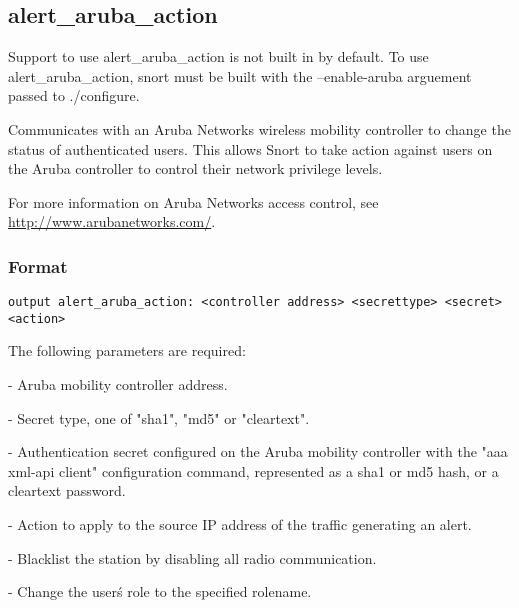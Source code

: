 \documentclass[english]{report}
\newenvironment{note}{
\samepage
    \vspace{10pt}{\textsf{
        {\hspace{7pt}\Huge{$\triangle$\hspace{-12.5pt}{\Large{$^!$}}}}\hspace{5pt}
        {\Large{NOTE}}
    }
    }
   \begin{center}
    \par\vspace{-17pt}

    \begin{lrbox}{\savepar}
    \begin{minipage}[r]{6in}
}
{
    \end{minipage}
    \end{lrbox}
    \fbox{
        \usebox{
            \savepar
	}
    }
    \par\vskip10pt
    \end{center}
}
\begin{document}
\subsection{alert\_aruba\_action}

\begin{note}
Support to use alert\_aruba\_action is not built in by default.  To
use alert\_aruba\_action, snort must be built with the --enable-aruba
arguement passed to ./configure.
\end{note}

Communicates with an Aruba Networks wireless mobility controller to
change the status of authenticated users.  This allows Snort to take
action against users on the Aruba controller to control their network
privilege levels.

For more information on Aruba Networks access control, see
\url{http://www.arubanetworks.com/}.

\subsubsection{Format}

\begin{verbatim}
output alert_aruba_action: <controller address> <secrettype> <secret> <action>
\end{verbatim}
%
The following parameters are required:

\begin{description}{}
\item [\texttt{controller address}] - Aruba mobility controller address.
\item [\texttt{secrettype}] - Secret type, one of "sha1", "md5" or "cleartext".
\item [\texttt{secret}] - Authentication secret configured on the Aruba mobility controller with the "aaa xml-api client" configuration command, represented as a sha1 or md5 hash, or a cleartext password.
\item [\texttt{action}] - Action to apply to the source IP address of the traffic generating an alert.

  \begin{description}{}
      \item [\texttt{blacklist}]- Blacklist the station by disabling all radio communication.
      \item [\texttt{setrole:rolename}]- Change the user\'s role to the specified rolename.
  \end{description}
\end{description}
\end{document}
